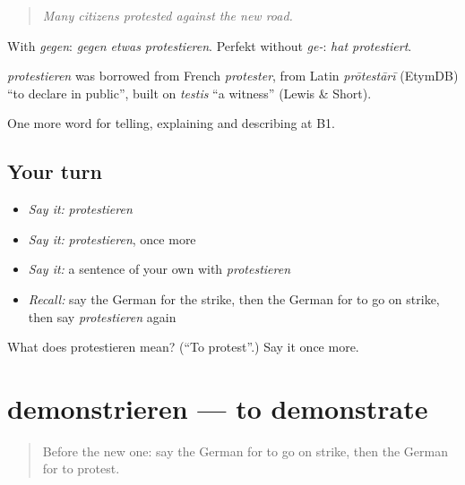 \begin{quote}
\emph{Many citizens protested against the new road.}
\end{quote}

With \emph{gegen}: \emph{gegen etwas protestieren}. Perfekt without \emph{ge-}: \emph{hat protestiert}.

\begin{cousinweb}
\emph{protestieren} was borrowed from French \emph{protester}, from Latin \emph{prōtestārī} (EtymDB) \textquotedblleft{}to declare in public\textquotedblright{}, built on \emph{testis} \textquotedblleft{}a witness\textquotedblright{} (Lewis \& Short).
\end{cousinweb}

\begin{grammarlens}[title={What you've built}]
One more word for telling, explaining and describing at B1.
\end{grammarlens}

\subsection*{Your turn}
\begin{itemize}
\raggedright
  \item \emph{Say it:} \emph{protestieren}
  \item \emph{Say it:} \emph{protestieren}, once more
  \item \emph{Say it:} a sentence of your own with \emph{protestieren}
  \item \emph{Recall:} say the German for the strike, then the German for to go on strike, then say \emph{protestieren} again
\end{itemize}

\begin{tcolorbox}[breakable,colback=teal!4,colframe=teal!35!black,title={Before you move on}]
What does protestieren mean? (\textquotedblleft{}To protest\textquotedblright{}.) Say it once more.
\end{tcolorbox}
\section[demonstrieren]{demonstrieren — to demonstrate}

\label{lesson:GE-C277-demonstrieren}



\begin{quote}
Before the new one: say the German for to go on strike, then the German for to protest.
\end{quote}

